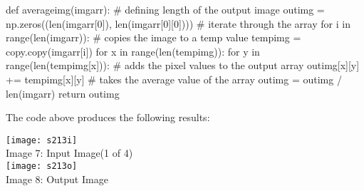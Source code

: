 \documentclass{article}
\begin{document}
	\noindent def average\textunderscore img(img\textunderscore arr):\newline
	\newline
	\indent \# defining length of the output image\newline
	\indent out\textunderscore img = np.zeros((len(img\textunderscore arr[0]), len(img\textunderscore arr[0][0])))\newline
	\newline
	\indent \# iterate through the array\newline
	\indent for i in range(len(img\textunderscore arr)):\newline
	\newline
	\indent \indent \# copies the image to a temp value\newline
	\indent \indent temp\textunderscore img = copy.copy(img\textunderscore arr[i])\newline
	\indent \indent for x in range(len(temp\textunderscore img)):\newline
	\newline
	\indent \indent \indent for y in range(len(temp\textunderscore img[x])):\newline
	\newline
	\indent \indent \indent \indent \# adds the pixel values to the output array\newline
	\indent \indent \indent \indent out\textunderscore img[x][y] += temp\textunderscore img[x][y]\newline
	\newline
	\indent \# takes the average value of the array\newline
	\indent out\textunderscore img = out\textunderscore img / len(img\textunderscore arr)\newline
	\newline
	\indent return out\textunderscore img\newline
	
	The code above produces the following results: \\
	
	\begin{center}
		\noindent \texttt{[image: s213i]}\\
		Image 7: Input Image(1 of 4)\\
		\texttt{[image: s213o]}\\
		Image 8: Output Image\\
		
	\end{center}
	
\end{document}
